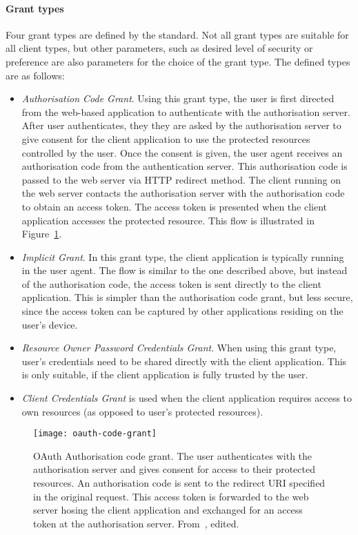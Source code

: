 \paragraph{Grant types} Four grant types are defined by the standard. Not all grant types are suitable for all client types, but other parameters, such as desired level of security or preference are also parameters for the choice of the grant type. The defined types are as follows:

\begin{itemize}[noitemsep]
    \item \textit{Authorisation Code Grant}. Using this grant type, the user is first directed from the web-based application to authenticate with the authorisation server. After user authenticates, they they are asked by the authorisation server to give consent for the client application to use the protected resources controlled by the user. Once the consent is given, the user agent receives an authorisation code from the authentication server. This authorisation code is passed to the web server via HTTP redirect method. The client running on the web server contacts the authorisation server with the authorisation code to obtain an access token. The access token is presented when the client application accesses the protected resource. This flow is illustrated in Figure~\ref{fig:oauth-code-grant}.
    \item \textit{Implicit Grant}. In this grant type, the client application is typically running in the user agent. The flow is similar to the one described above, but instead of the authorisation code, the access token is sent directly to the client application. This is simpler than the authorisation code grant, but less secure, since the access token can be captured by other applications residing on the user's device.
    \item \textit{Resource Owner Password Credentials Grant}. When using this grant type, user's credentials need to be shared directly with the client application. This is only suitable, if the client application is fully trusted by the user.
    \item \textit{Client Credentials Grant} is used when the client application requires access to own resources (as opposed to user's protected resources).
\end{itemize}

\begin{figure}[ht]
    \centering
    \texttt{[image: oauth-code-grant]}
    \caption{OAuth Authorisation code grant. The user authenticates with the authorisation server and gives consent for access to their protected resources. An authorisation code is sent to the redirect URI specified in the original request. This access token is forwarded to the web server hosing the client application and exchanged for an access token at the authorisation server. From~\cite{Hardt2012TheFramework}, edited.}
    \label{fig:oauth-code-grant}
\end{figure}

